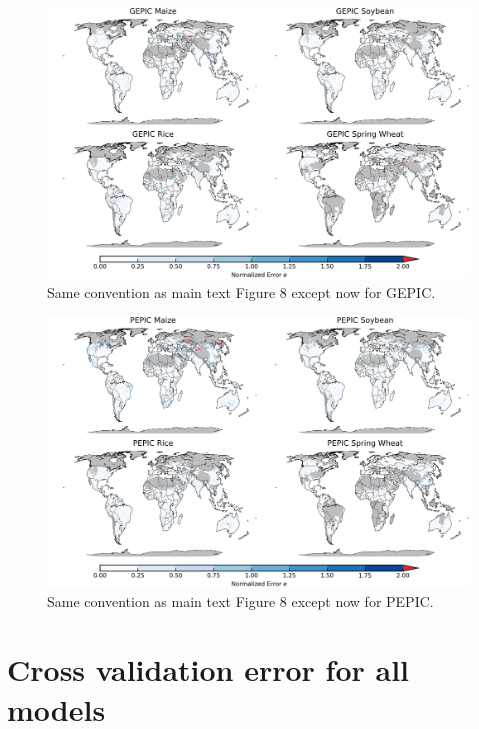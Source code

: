 \documentclass[10pt]{article}
\begin{document}
\begin{figure}[h!]
\centering
\includegraphics[width=15.5cm]{GEPIC_spatial_error.png}
\caption{Same convention as main text Figure 8 except now for GEPIC.}
\label{fig:lpjmlnorm}
\end{figure}

\begin{figure}[h!]
\centering
\includegraphics[width=15.5cm]{PEPIC_spatial_error.png}
\caption{Same convention as main text Figure 8 except now for PEPIC.}
\label{fig:lpjmlnorm}
\end{figure}

\clearpage
\section{Cross validation error for all models}
\end{document}
